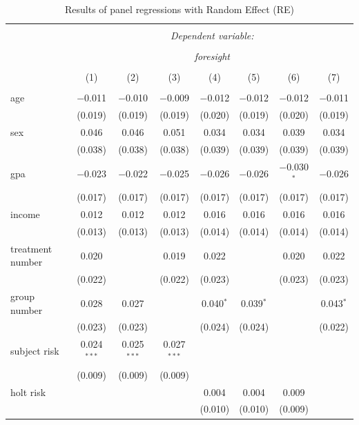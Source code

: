 \documentclass[12pt]{article}
\begin{document}
	\begin{table}[!htbp] \centering 
		  \caption{Results of panel regressions with Random Effect (RE)} 
		  \label{panelreg} 
		  \scriptsize
		\begin{tabular}{@{\extracolsep{5pt}}lccccccc} 
		\\[-1.8ex]\hline 
		\hline \\[-1.8ex] 
		 & \multicolumn{7}{c}{\textit{Dependent variable:}} \\ 
		\cline{2-8} 
		\\[-1.8ex] & \multicolumn{7}{c}{\textit{foresight}} \\ 
		\\[-1.8ex] & (1) & (2) & (3) & (4) & (5) & (6) & (7)\\ 
		\hline \\[-1.8ex] 
		 age & $-$0.011 & $-$0.010 & $-$0.009 & $-$0.012 & $-$0.012 & $-$0.012 & $-$0.011 \\ 
		  & (0.019) & (0.019) & (0.019) & (0.020) & (0.019) & (0.020) & (0.019) \\ 
		 sex & 0.046 & 0.046 & 0.051 & 0.034 & 0.034 & 0.039 & 0.034 \\ 
		  & (0.038) & (0.038) & (0.038) & (0.039) & (0.039) & (0.039) & (0.039) \\ 
		 gpa & $-$0.023 & $-$0.022 & $-$0.025 & $-$0.026 & $-$0.026 & $-$0.030$^{*}$ & $-$0.026 \\ 
		  & (0.017) & (0.017) & (0.017) & (0.017) & (0.017) & (0.017) & (0.017) \\ 
		 income & 0.012 & 0.012 & 0.012 & 0.016 & 0.016 & 0.016 & 0.016 \\ 
		  & (0.013) & (0.013) & (0.013) & (0.014) & (0.014) & (0.014) & (0.014) \\ 
		 treatment number & 0.020 &  & 0.019 & 0.022 &  & 0.020 & 0.022 \\ 
		  & (0.022) &  & (0.022) & (0.023) &  & (0.023) & (0.023) \\ 
		 group number& 0.028 & 0.027 &  & 0.040$^{*}$ & 0.039$^{*}$ &  & 0.043$^{*}$ \\ 
		  & (0.023) & (0.023) &  & (0.024) & (0.024) &  & (0.022) \\ 
		 subject risk & 0.024$^{***}$ & 0.025$^{***}$ & 0.027$^{***}$ &  &  &  &  \\ 
		  & (0.009) & (0.009) & (0.009) &  &  &  &  \\ 
		 holt risk &  &  &  & 0.004 & 0.004 & 0.009 &  \\ 
		  &  &  &  & (0.010) & (0.010) & (0.009) &  \\ 

\end{tabular}
\end{table}
\end{document}
